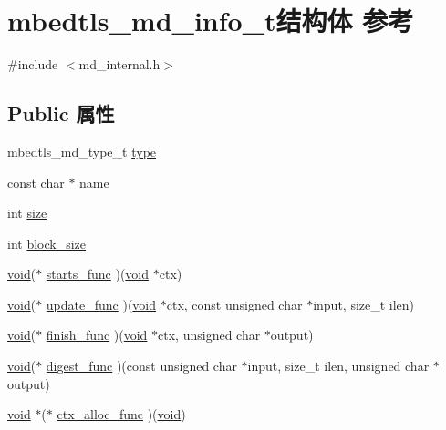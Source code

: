 \hypertarget{structmbedtls__md__info__t}{}\section{mbedtls\+\_\+md\+\_\+info\+\_\+t结构体 参考}
\label{structmbedtls__md__info__t}


{\ttfamily \#include $<$md\+\_\+internal.\+h$>$}

\subsection*{Public 属性}
\begin{DoxyCompactItemize}
\item 
mbedtls\+\_\+md\+\_\+type\+\_\+t \hyperlink{structmbedtls__md__info__t_ae27d588a1b1a7c4f96384fc5705f5c3d}{type}
\item 
const char $\ast$ \hyperlink{structmbedtls__md__info__t_a91340331832845c885d99884426d21c6}{name}
\item 
int \hyperlink{structmbedtls__md__info__t_a17a6641cfc5d4e7542d450463c4122f6}{size}
\item 
int \hyperlink{structmbedtls__md__info__t_a2090181c3aef5c7d692147340a6bdf99}{block\+\_\+size}
\item 
\hyperlink{interfacevoid}{void}($\ast$ \hyperlink{structmbedtls__md__info__t_a63f493cb3f21ba384544cc8094b98695}{starts\+\_\+func} )(\hyperlink{interfacevoid}{void} $\ast$ctx)
\item 
\hyperlink{interfacevoid}{void}($\ast$ \hyperlink{structmbedtls__md__info__t_ababa3afde569e7f97f86639bad8b91ef}{update\+\_\+func} )(\hyperlink{interfacevoid}{void} $\ast$ctx, const unsigned char $\ast$input, size\+\_\+t ilen)
\item 
\hyperlink{interfacevoid}{void}($\ast$ \hyperlink{structmbedtls__md__info__t_a5d5edae28954af967e8c3f85ed468926}{finish\+\_\+func} )(\hyperlink{interfacevoid}{void} $\ast$ctx, unsigned char $\ast$output)
\item 
\hyperlink{interfacevoid}{void}($\ast$ \hyperlink{structmbedtls__md__info__t_a64b2000256fe6384d3af30a1e2b20282}{digest\+\_\+func} )(const unsigned char $\ast$input, size\+\_\+t ilen, unsigned char $\ast$output)
\item 
\hyperlink{interfacevoid}{void} $\ast$($\ast$ \hyperlink{structmbedtls__md__info__t_ad14056b534fc7145cfb251c00786c2c0}{ctx\+\_\+alloc\+\_\+func} )(\hyperlink{interfacevoid}{void})
\item 

\end{DoxyCompactItemize}
